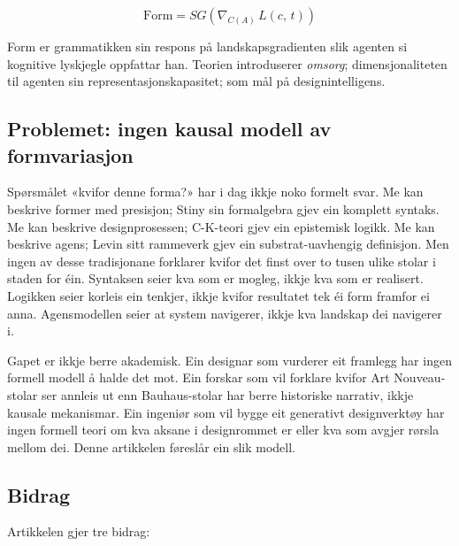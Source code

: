 \begin{equation*}
\mathrm{Form} = SG\!\left(\nabla_{C(A)}\, L(c,\, t)\right)
\end{equation*}

\noindent Form er grammatikken sin respons på landskapsgradienten slik agenten si kognitive lyskjegle oppfattar han. Teorien introduserer \textit{omsorg}; dimensjonaliteten til agenten sin representasjonskapasitet; som mål på designintelligens.

\subsection{Problemet: ingen kausal modell av formvariasjon}

Spørsmålet «kvifor denne forma?» har i dag ikkje noko formelt svar. Me kan beskrive former med presisjon; Stiny sin formalgebra gjev ein komplett syntaks. Me kan beskrive designprosessen; C-K-teori gjev ein epistemisk logikk. Me kan beskrive agens; Levin sitt rammeverk gjev ein substrat-uavhengig definisjon. Men ingen av desse tradisjonane forklarer kvifor det finst over to tusen ulike stolar i staden for éin. Syntaksen seier kva som er mogleg, ikkje kva som er realisert. Logikken seier korleis ein tenkjer, ikkje kvifor resultatet tek éi form framfor ei anna. Agensmodellen seier at system navigerer, ikkje kva landskap dei navigerer i.

Gapet er ikkje berre akademisk. Ein designar som vurderer eit framlegg har ingen formell modell å halde det mot. Ein forskar som vil forklare kvifor Art Nouveau-stolar ser annleis ut enn Bauhaus-stolar har berre historiske narrativ, ikkje kausale mekanismar. Ein ingeniør som vil bygge eit generativt designverktøy har ingen formell teori om kva aksane i designrommet er eller kva som avgjer rørsla mellom dei. Denne artikkelen føreslår ein slik modell.

\subsection{Bidrag}

Artikkelen gjer tre bidrag:

